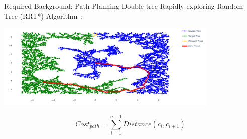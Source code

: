 \begin{frame}[fragile]{Required Background: Path Planning} 
  Double-tree Rapidly exploring Random Tree (RRT*) Algorithm~\cite{chen_fast_2018}:
  \begin{center}
  \includegraphics[width=0.8\textwidth]{figures/required_background/path_found}
  \end{center}
\[\mathit{Cost_{path}} = \sum_{i=1}^{n-1} \mathit{Distance}(c_i, c_{i+1})\]
\end{frame}
